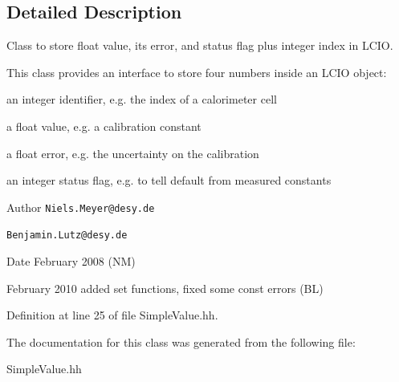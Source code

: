 \subsection{Detailed Description}
Class to store float value, its error, and status flag plus integer index in L\-C\-I\-O. 

This class provides an interface to store four numbers inside an L\-C\-I\-O object\-:
\begin{DoxyItemize}
\item an integer identifier, e.\-g. the index of a calorimeter cell
\item a float value, e.\-g. a calibration constant
\item a float error, e.\-g. the uncertainty on the calibration
\item an integer status flag, e.\-g. to tell default from measured constants
\end{DoxyItemize}

\begin{DoxyAuthor}{Author}
{\tt Niels.\-Meyer@desy.\-de} 

{\tt Benjamin.\-Lutz@desy.\-de} 
\end{DoxyAuthor}
\begin{DoxyDate}{Date}
February 2008 (N\-M) 

February 2010 added set functions, fixed some const errors (B\-L) 
\end{DoxyDate}


Definition at line 25 of file Simple\-Value.\-hh.



The documentation for this class was generated from the following file\-:\begin{DoxyCompactItemize}
\item 
Simple\-Value.\-hh\end{DoxyCompactItemize}
